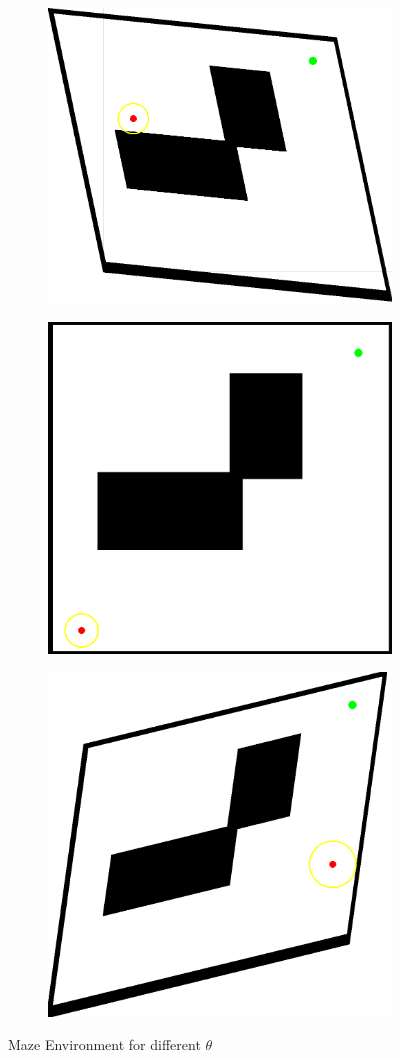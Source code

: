 \begin{figure}[H]
    \centering
    \begin{subfigure}{0.45\textwidth}
        \centering
        \includegraphics[width=0.55\linewidth]{images/maze_0.9_-0.17_-0.09_0.82.png}
    \end{subfigure}
    \hfill
    \begin{subfigure}{0.45\textwidth}
        \centering
        \includegraphics[width=0.55\linewidth]{images/maze_1.png}
    \end{subfigure}
    \hfill
    \begin{subfigure}{0.45\textwidth}
        \centering
        \includegraphics[width=0.55\linewidth]{images/maze_0.62_0.07_0.15_0.56.png}
    \end{subfigure}
    \caption{Maze Environment for different $\theta$}
    \label{fig:mazenv}
\end{figure}


